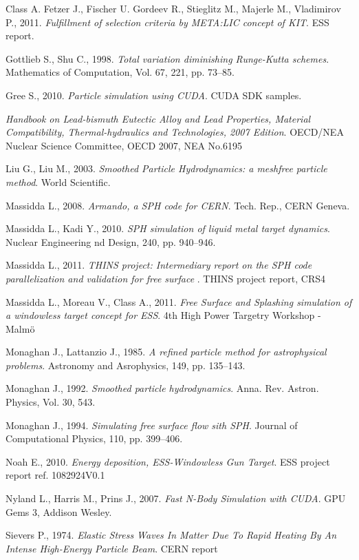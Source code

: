 \documentclass[a4paper, 11pt, twocolumn]{article}
\begin{document}
\begin{thebibliography}{9}


 Class A. Fetzer J., Fischer U. Gordeev R., Stieglitz M., Majerle M., Vladimirov P., 2011.
 \emph{Fulfillment of selection criteria by META:LIC concept of KIT}.
 ESS report.

 Gottlieb S., Shu C., 1998.
 \emph{Total variation diminishing Runge-Kutta schemes}.
 Mathematics of Computation, Vol. 67, 221, pp. 73--85.

 Gree S., 2010.
 \emph{Particle simulation using CUDA}.
 CUDA SDK samples.

 \emph{Handbook on Lead-bismuth Eutectic Alloy and Lead Properties, Material Compatibility,
Thermal-hydraulics and Technologies, 2007 Edition}.
OECD/NEA Nuclear Science Committee, OECD 2007, NEA No.6195

 Liu G., Liu M., 2003. 
 \emph{Smoothed Particle Hydrodynamics: a meshfree particle method}.
 World Scientific.

 Massidda L., 2008.
 \emph{Armando, a SPH code for CERN}.
 Tech. Rep., CERN Geneva.

 Massidda L., Kadi Y., 2010.
 \emph{SPH simulation of liquid metal target dynamics}.
 Nuclear Engineering nd Design, 240, pp. 940--946.

 Massidda L., 2011.
 \emph{THINS project: Intermediary report on the SPH code parallelization and validation for free surface }.
 THINS project report, CRS4

 Massidda L., Moreau V., Class A., 2011.
 \emph{Free Surface and Splashing simulation of a windowless target concept for ESS}.
 4th High Power Targetry Workshop - Malmö

 Monaghan J., Lattanzio J., 1985.
 \emph{A refined particle method for astrophysical problems}.
 Astronomy and Asrophysics, 149, pp. 135--143.

 Monaghan J., 1992.
 \emph{Smoothed particle hydrodynamics}.
 Anna. Rev. Astron. Physics, Vol. 30, 543.

 Monaghan J., 1994.
 \emph{Simulating free surface flow sith SPH}.
 Journal of Computational Physics, 110, pp. 399--406.
 
 Noah E., 2010. 
 \emph{Energy deposition, ESS-Windowless Gun Target}. ESS project report ref. 1082924V0.1
 
 Nyland L., Harris M., Prins J., 2007.
 \emph{Fast N-Body Simulation with CUDA}.
 GPU Gems 3, Addison Wesley.
 
 Sievers P., 1974.
 \emph{Elastic Stress Waves In Matter Due To Rapid Heating By An Intense High-Energy Particle Beam}.
 CERN report

\end{thebibliography}
\end{document}
